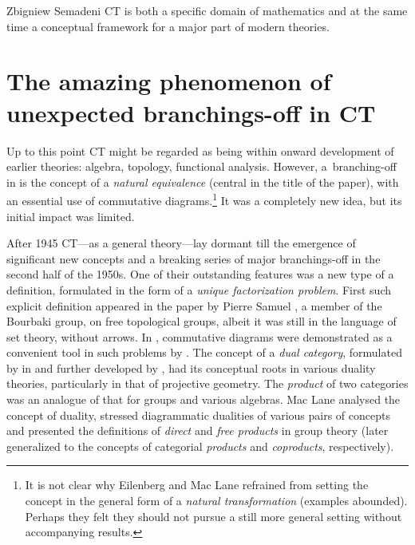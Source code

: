 \begin{artengenv}{Zbigniew Semadeni}
CT is both a specific domain of mathematics and at the same time a conceptual framework 
for a major part of modern theories. 

\section{The amazing phenomenon of unexpected branchings-off in CT}
Up to this point CT might be regarded as being within onward development of 
earlier theories: algebra, topology, functional analysis. However, a~branching-off 
in \parencite{E-ML} is the concept of a \textit{natural equivalence} (central in the title 
of the paper), with an essential use of commutative diagrams.\footnote{ It is not 
clear why Eilenberg and Mac Lane refrained from setting the concept in the general 
form of a \textit{natural transformation} (examples abounded). Perhaps they felt 
they should not pursue a still more general setting without accompanying 
results.} %
It was a completely new idea, but its initial impact was limited. 

After 1945 CT---as a general theory---lay dormant till the emergence of 
significant new concepts and a breaking series of major branchings-off in the 
second half of the 1950s. One of their outstanding features was a new type of a 
definition, formulated in the form of a \textit{unique factorization problem}. 
First such explicit definition appeared in the paper by Pierre Samuel \parencite*{Samuel}, 
a member of the Bourbaki group, on free topological groups, albeit it was still 
in the language of set theory, without arrows. 
In \parencite*{Duality}, commutative diagrams were demonstrated as a convenient 
tool in such problems by  \citeauthor{Duality}. 
The concept of a \textit{dual category}, formulated by \citeauthor{E-ML} in \parencite*[p.259]{E-ML} and 
further developed by \citeauthor{Duality} \parencite*{Duality}, had its conceptual roots in various 
duality theories, particularly in that of projective geometry. The \textit{product} 
of two categories was an analogue of that for groups and various algebras. 
Mac Lane analysed the concept of duality, 
stressed diagrammatic dualities of various pairs of concepts and presented the 
definitions of \textit{direct} and \textit{free products} in group theory (later 
generalized to the concepts of categorial \textit{products} and \textit{coproducts}, 
respectively). 


\end{artengenv}
